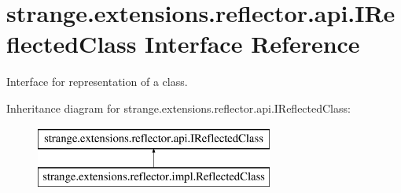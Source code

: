 \hypertarget{interfacestrange_1_1extensions_1_1reflector_1_1api_1_1_i_reflected_class}{\section{strange.\-extensions.\-reflector.\-api.\-I\-Reflected\-Class Interface Reference}
\label{interfacestrange_1_1extensions_1_1reflector_1_1api_1_1_i_reflected_class}
}


Interface for representation of a class.  


Inheritance diagram for strange.\-extensions.\-reflector.\-api.\-I\-Reflected\-Class\-:\begin{figure}[H]
\begin{center}
\leavevmode
\includegraphics[height=2.000000cm]{interfacestrange_1_1extensions_1_1reflector_1_1api_1_1_i_reflected_class}
\end{center}
\end{figure}
